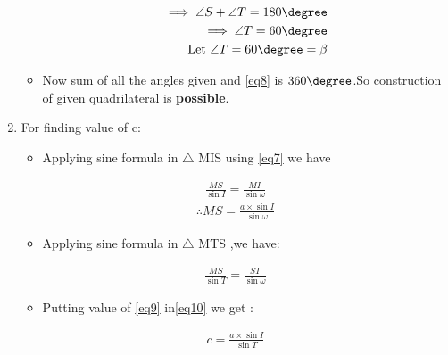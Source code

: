 \documentclass[journal,12pt,twocolumn]{IEEEtran}
\begin{document}
\begin{enumerate}
\begin{itemize}
\begin{align}
\implies \angle S + \angle T = 180\degree 
\\
\implies \angle T = 60\degree 
\\
\text{Let }\angle T = 60\degree =\beta \label{eq8}
\end{align}
\item Now sum of all the angles given and \eqref{eq8} is $360\degree$.So construction of given quadrilateral is \textbf{possible}.
\end{itemize}
\item For finding value of c:
\begin{itemize}
\item Applying sine formula in $\triangle$ MIS using \eqref{eq7} we have
\end{itemize}
\begin{align}
\frac{MS}{\sin I}=\frac{MI}{\sin \omega }
\end{align}
\begin{align}
\therefore MS=\frac{a\times \sin I}{\sin \omega} \label{eq9}
\end{align}
\begin{itemize}
\item Applying sine formula in $\triangle$ MTS ,we have:
\end{itemize}
\begin{align}
  \frac{MS}{\sin T}=\frac{ST}{\sin \omega} \label{eq10}  
\end{align}
\begin{itemize}
\item Putting value of \eqref{eq9} in\eqref{eq10}
we get :
\end{itemize}
\begin{align}
c=\frac{a\times \sin I}{\sin T} \label{eq11}
\end{align}
\end{enumerate}
\end{document}
